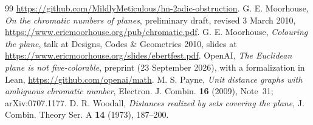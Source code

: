 \documentclass[11pt,a4paper]{amsart}
\theoremstyle{remark}
\begin{document}
\begin{thebibliography}{99}
\url{https://github.com/MildlyMeticulous/hn-2adic-obstruction}.
 G. E. Moorhouse, \emph{On the chromatic numbers of planes}, preliminary draft, revised
3 March 2010, \url{https://www.ericmoorhouse.org/pub/chromatic.pdf}.
 G. E. Moorhouse, \emph{Colouring the plane}, talk at Designs, Codes \& Geometries
2010, slides at \url{https://www.ericmoorhouse.org/slides/ebertfest.pdf}.
 OpenAI, \emph{The Euclidean plane is not five-colorable}, preprint (23 September 2026), with a
formalization in Lean, \url{https://github.com/openai/math}.
 M. S. Payne, \emph{Unit distance graphs with ambiguous chromatic number}, Electron. J. Combin.
\textbf{16} (2009), Note~31; arXiv:0707.1177.
 D. R. Woodall, \emph{Distances realized by sets covering the plane}, J. Combin. Theory Ser. A
\textbf{14} (1973), 187--200.
\end{thebibliography}
\end{document}
